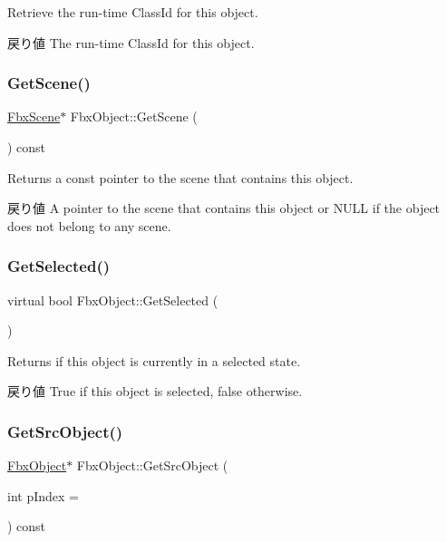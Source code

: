 Retrieve the run-\/time Class\+Id for this object. \begin{DoxyReturn}{戻り値}
The run-\/time Class\+Id for this object. 
\end{DoxyReturn}
\mbox{\label{class_fbx_object_a2e76cc1e34a8474a4dddd7dee28e04c2}} 
\subsubsection{\texorpdfstring{Get\+Scene()}{GetScene()}}
{\footnotesize\ttfamily \hyperlink{class_fbx_scene}{Fbx\+Scene}$\ast$ Fbx\+Object\+::\+Get\+Scene (\begin{DoxyParamCaption}{ }\end{DoxyParamCaption}) const}

Returns a const pointer to the scene that contains this object. \begin{DoxyReturn}{戻り値}
A pointer to the scene that contains this object or {\ttfamily N\+U\+LL} if the object does not belong to any scene. 
\end{DoxyReturn}
\mbox{\label{class_fbx_object_ade0dddb02e39f6823d0bea6071ef4410}} 
\subsubsection{\texorpdfstring{Get\+Selected()}{GetSelected()}}
{\footnotesize\ttfamily virtual bool Fbx\+Object\+::\+Get\+Selected (\begin{DoxyParamCaption}{ }\end{DoxyParamCaption})\hspace{0.3cm}{\ttfamily [virtual]}}

Returns if this object is currently in a selected state. \begin{DoxyReturn}{戻り値}
{\ttfamily True} if this object is selected, {\ttfamily false} otherwise. 
\end{DoxyReturn}
\mbox{\label{class_fbx_object_a655ed30675d9bf1686ec075f5e7c7a84}} 
\subsubsection{\texorpdfstring{Get\+Src\+Object()}{GetSrcObject()}\hspace{0.1cm}{\footnotesize\ttfamily [1/4]}}
{\footnotesize\ttfamily \hyperlink{class_fbx_object}{Fbx\+Object}$\ast$ Fbx\+Object\+::\+Get\+Src\+Object (\begin{DoxyParamCaption}\item[{int}]{p\+Index = {} }\end{DoxyParamCaption}) const\hspace{0.3cm}{\ttfamily [inline]}}

